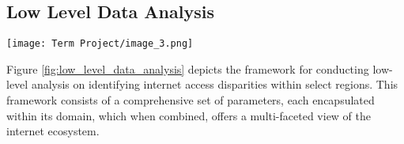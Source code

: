 \documentclass[conference]{IEEEtran}
\begin{document}



\subsection{Low Level Data Analysis}

\begin{figure*}[!htbp]
    \centering
    \texttt{[image: Term Project/image\_3.png]}
    \caption{Low Level Data Analysis Parameters}
    \label{fig:low_level_data_analysis}
\end{figure*}


Figure  \ref{fig:low_level_data_analysis} depicts the framework for conducting low-level analysis on identifying internet access disparities  within select regions. This framework consists of a comprehensive set of parameters, each encapsulated within its domain, which when combined, offers a multi-faceted view of the internet ecosystem.
\end{document}
